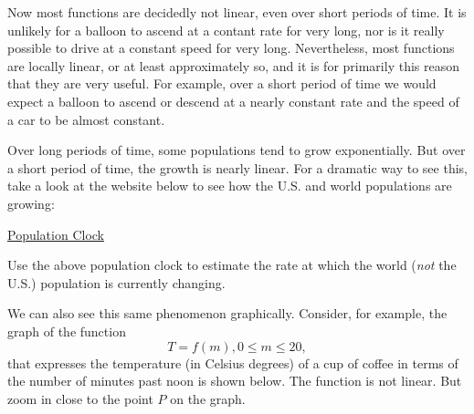 \documentclass{ximera}
\begin{document}

Now most functions are decidedly not linear, even over short periods of time. It is unlikely for a balloon to ascend at a contant rate for very long, nor is it really possible to drive at a constant speed for very long. Nevertheless, most functions are locally linear, or at least approximately so, and it is for primarily this reason that they are very useful. For example, over a short period of time we would expect a balloon to ascend or descend at a nearly constant rate and the speed of a car to be almost constant. 

Over long periods of time, some populations tend to grow exponentially. But over a short period of time, the growth is nearly linear. For a dramatic way to see this, take a look at the website below to see how the U.S. and world populations are growing:

\href{https://www.census.gov/popclock/}{Population Clock}

\begin{question} \label{Q1:LF}
Use the above population clock to estimate the rate at which the world (\emph{not} the U.S.) population is currently changing.
\end{question}

We can also see this same phenomenon graphically. Consider, for example, the graph of the function
\[
    T = f(m) , 0\leq m \leq 20 ,
\]
that expresses the temperature (in Celsius degrees) of a cup of coffee in terms of the number of minutes past noon is shown below. The function is not linear. But zoom in close to the point $P$ on the graph.
\end{document}
